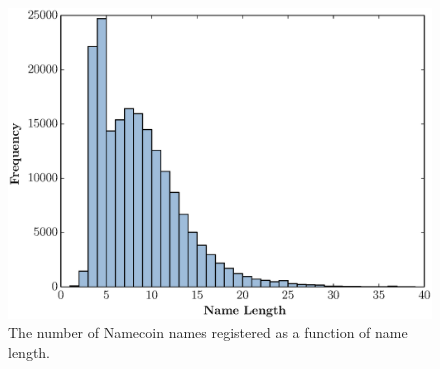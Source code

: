 \begin{figure}
  \centering
  \includegraphics[width=\columnwidth]{figures/name_length_histogram}
  \caption{The number of Namecoin names registered as a function of name length.}
  \label{fig:name_length_histogram}
\end{figure}
